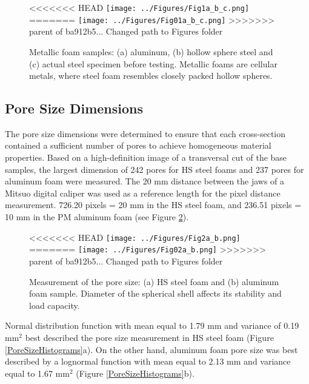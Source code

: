 \documentclass[review]{elsarticle}
\begin{document}
\begin{figure}[htbp]
	\begin{center}
<<<<<<< HEAD
		\texttt{[image: ../Figures/Fig1a\_b\_c.png]}
=======
		\texttt{[image: ../Figures/Fig01a\_b\_c.png]}
>>>>>>> parent of ba912b5... Changed path to Figures folder
		\caption{Metallic foam samples: (a) aluminum, (b) hollow sphere steel and (c) actual steel specimen before testing. Metallic foams are cellular metals, where steel foam resembles closely packed hollow spheres.}
		\label{Samples}
	\end{center}
\end{figure}

\subsection*{Pore Size Dimensions}

The pore size dimensions were determined to ensure that each cross-section contained a sufficient number of pores to achieve homogeneous material properties. Based on a high-definition image of a transversal cut of the base samples, the largest dimension of 242 pores for HS steel foams and 237 pores for aluminum foam were measured. The 20 mm distance between the jaws of a Mitsuo digital caliper was used as a reference length for the pixel distance measurement. 726.20 pixels = 20 mm in the HS steel foam, and 236.51 pixels = 10 mm in the PM aluminum foam (see Figure \ref{PoreMeas}).

\begin{figure}[htbp]
	\begin{center}
<<<<<<< HEAD
		\texttt{[image: ../Figures/Fig2a\_b.png]}
=======
		\texttt{[image: ../Figures/Fig02a\_b.png]}
>>>>>>> parent of ba912b5... Changed path to Figures folder
		\caption{Measurement of the pore size: (a) HS steel foam and (b) aluminum foam sample. Diameter of the spherical shell affects its stability and load capacity.}
		\label{PoreMeas}
	\end{center}
\end{figure}

Normal distribution function with mean equal to 1.79 mm and variance of 0.19 mm$^2$ best described the pore size measurement in HS steel foam (Figure \ref{PoreSizeHistograms}a). On the other hand, aluminum foam pore size was best described by a lognormal function with mean equal to 2.13 mm and variance equal to 1.67 mm$^2$ (Figure \ref{PoreSizeHistograms}b).
\end{document}

